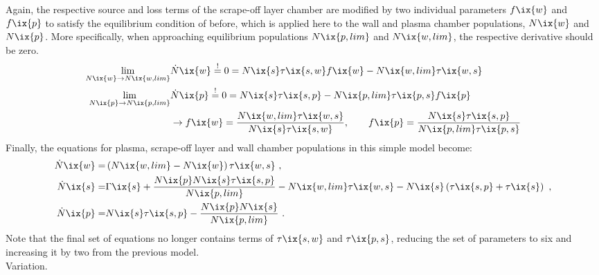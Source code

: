%
            Again, the respective source and loss terms of the scrape-off layer chamber are modified by two individual parameters $f\ix{w}$ and $f\ix{p}$ to satisfy the equilibrium condition of before, which is applied here to the wall and plasma chamber populations, $N\ix{w}$ and $N\ix{p}$. More specifically, when approaching equilibrium populations $N\ix{p,lim}$ and $N\ix{w,lim}$, the respective derivative should be zero.%
%
            \begin{align}%
                \begin{split}\label{eq:threechamber_limes}%
                    \displaystyle\lim_{N\ix{w}\to N\ix{w,lim}}&\dot{N}\ix{w}\overset{!}{=}0=N\ix{s}\tau\ix{s,w}f\ix{w}-N\ix{w,lim}\tau\ix{w,s}\\%
                    \displaystyle\lim_{N\ix{p}\to N\ix{p,lim}}&\dot{N}\ix{p}\overset{!}{=}0=N\ix{s}\tau\ix{s,p}-N\ix{p,lim}\tau\ix{p,s}f\ix{p}\\%
                    &\rightarrow f\ix{w}=\frac{N\ix{w,lim}\tau\ix{w,s}}{N\ix{s}\tau\ix{s,w}},\qquad f\ix{p}=\frac{N\ix{s}\tau\ix{s,p}}{N\ix{p,lim}\tau\ix{p,s}}%
                \end{split}%
            \end{align}%
%
            Finally, the equations for plasma, scrape-off layer and wall chamber populations in this simple model become:%
%
            \begin{align}%
                \begin{split}\label{eq:threechamber}%
                    \dot{N}\ix{w}=&\left(N\ix{w,lim}-N\ix{w}\right)\tau\ix{w,s}\,\,,\\%
                    \dot{N}\ix{s}=&\Gamma\ix{s}+\frac{N\ix{p}N\ix{s}\tau\ix{s,p}}{N\ix{p,lim}}-N\ix{w,lim}\tau\ix{w,s}-N\ix{s}\left(\tau\ix{s,p}+\tau\ix{s}\right)\,\,,\\%
                    \dot{N}\ix{p}=&N\ix{s}\tau\ix{s,p}-\frac{N\ix{p}N\ix{s}}{N\ix{p,lim}}\,\,.%
                \end{split}%
            \end{align}%
%
            Note that the final set of equations no longer contains terms of $\tau\ix{s,w}$ and $\tau\ix{p,s}$, reducing the set of parameters to six and increasing it by two from the previous model.\\%
            Variation.\\%
